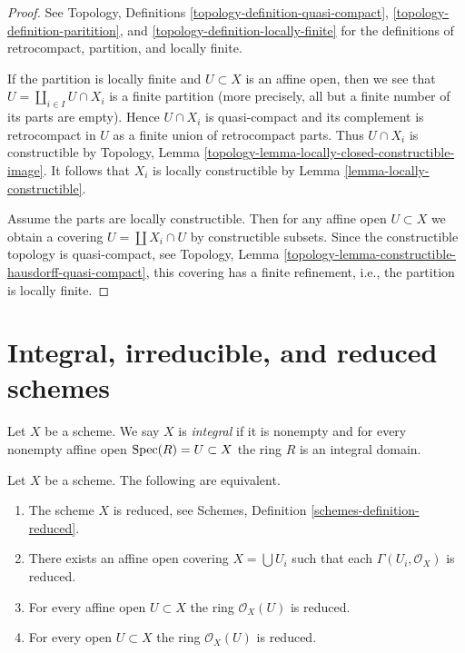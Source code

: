 \begin{proof}
See Topology, Definitions
\ref{topology-definition-quasi-compact},
\ref{topology-definition-paritition}, and
\ref{topology-definition-locally-finite}
for the definitions of retrocompact, partition, and locally finite.

\medskip\noindent
If the partition is locally finite and $U \subset X$ is an
affine open, then we see that $U = \coprod_{i \in I} U \cap X_i$
is a finite partition (more precisely, all but a finite number
of its parts are empty). Hence $U \cap X_i$ is quasi-compact
and its complement is retrocompact in $U$ as a finite union
of retrocompact parts. Thus $U \cap X_i$ is constructible
by Topology, Lemma \ref{topology-lemma-locally-closed-constructible-image}.
It follows that $X_i$ is locally constructible by
Lemma \ref{lemma-locally-constructible}.

\medskip\noindent
Assume the parts are locally constructible. Then for any affine
open $U \subset X$ we obtain a covering $U = \coprod X_i \cap U$
by constructible subsets. Since the constructible topology is
quasi-compact, see
Topology, Lemma \ref{topology-lemma-constructible-hausdorff-quasi-compact},
this covering has a finite refinement, i.e.,
the partition is locally finite.
\end{proof}




\section{Integral, irreducible, and reduced schemes}
\label{section-integral}

\begin{definition}
\label{definition-integral}
Let $X$ be a scheme. We say $X$ is {\it integral} if it is nonempty and
for every nonempty affine open $\mathop{\mathrm{Spec}}(R) = U \subset X$ the ring $R$
is an integral domain.
\end{definition}

\begin{lemma}
\label{lemma-characterize-reduced}
Let $X$ be a scheme.
The following are equivalent.
\begin{enumerate}
\item The scheme $X$ is reduced, see
Schemes, Definition \ref{schemes-definition-reduced}.
\item There exists an affine open covering $X = \bigcup U_i$
such that each $\Gamma(U_i, \mathcal{O}_X)$ is reduced.
\item For every affine open $U \subset X$ the ring
$\mathcal{O}_X(U)$ is reduced.
\item For every open $U \subset X$ the ring $\mathcal{O}_X(U)$ is reduced.
\end{enumerate}
\end{lemma}

